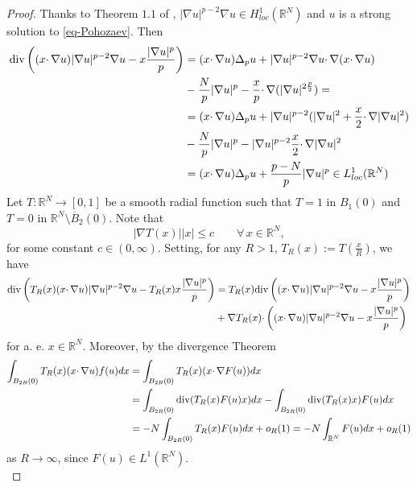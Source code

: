 \documentclass[11pt,reqno]{amsart}
\theoremstyle{definition}
\numberwithin{equation}{section}
\numberwithin{theorem}{section}
\numberwithin{equation}{section}
\numberwithin{theorem}{section}
\newcommand{\R}{\mathbb{R}}
\begin{document}
\begin{proof}
Thanks to Theorem $1.1$ of \cite{antonini2023interior}, $|\nabla u|^{p-2}\nabla u\in H^1_{loc}(\R^N)$ and $u$ is a strong solution to \eqref{eq-Pohozaev}. Then
\begin{equation}\notag
\begin{aligned}
{\rm div}\left((x\cdotp \nabla u)|\nabla u|^{p-2}\nabla u-x\frac{|\nabla u|^p}{p}\right)&= (x\cdotp \nabla u) \Delta_p u+|\nabla u|^{p-2}\nabla u\cdotp \nabla(x\cdotp \nabla u)\\
&-\frac{N}{p}|\nabla u|^p-\frac{x}{p}\cdotp\nabla(|\nabla u|^{2\frac{p}{2}})=\\
&=(x\cdotp \nabla u) \Delta_p u+|\nabla u|^{p-2}(|\nabla u|^2+\frac{x}{2}\cdotp\nabla|\nabla u|^2)\\
&-\frac{N}{p}|\nabla u|^p-|\nabla u|^{p-2}\frac{x}{2}\cdotp\nabla |\nabla u|^2\\
&=(x\cdotp \nabla u) \Delta_p u+\frac{p-N}{p}|\nabla u|^p\in L^1_{loc}(\R^N)
\end{aligned}
\end{equation}
Let $T:\R^N\to[0,1]$ be a smooth radial function such that $T=1$ in $B_1(0)$ and $T=0$ in $\R^N\setminus\overline{B}_2(0)$. Note that 
\begin{equation}\label{est-nablaT}
|\nabla T(x)||x|\le c\qquad\forall\,x\in\R^N,
\end{equation}
for some constant $c\in (0,\infty)$. Setting, for any $R>1$, $T_R(x):=T(\frac{x}{R})$, we have
\begin{equation}\notag
\begin{aligned}
{\rm div}\left(T_R(x)(x\cdotp \nabla u)|\nabla u|^{p-2}\nabla u-T_R(x)x\frac{|\nabla u|^p}{p}\right)&= T_R(x){\rm div}\left((x\cdotp \nabla u)|\nabla u|^{p-2}\nabla u-x\frac{|\nabla u|^p}{p}\right)\\
&+\nabla T_R(x)\cdotp \left((x\cdotp \nabla u)|\nabla u|^{p-2}\nabla u-x\frac{|\nabla u|^p}{p}\right)
\end{aligned}    
\end{equation}
for a. e. $x\in\R^N$. Moreover, by the divergence Theorem
\begin{equation}\notag
\begin{aligned}
\int_{B_{2R}(0)}T_R(x)(x\cdotp\nabla u)f(u) dx&=\int_{B_{2R}(0)}T_R(x)(x\cdotp\nabla F(u))dx\\
&=\int_{B_{2R}(0)}{\rm div}(T_R(x)F(u)x)dx-\int_{B_{2R}(0)}{\rm div}(T_R(x)x)F(u)dx\\
&=-N\int_{B_{2R}(0)}T_R(x)F(u)dx+o_R(1)=-N\int_{\R^N}F(u)dx+o_R(1)
\end{aligned}
\end{equation}
as $R\to\infty$, since $F(u)\in L^1(\R^N)$.\\


\end{proof}
\end{document}
